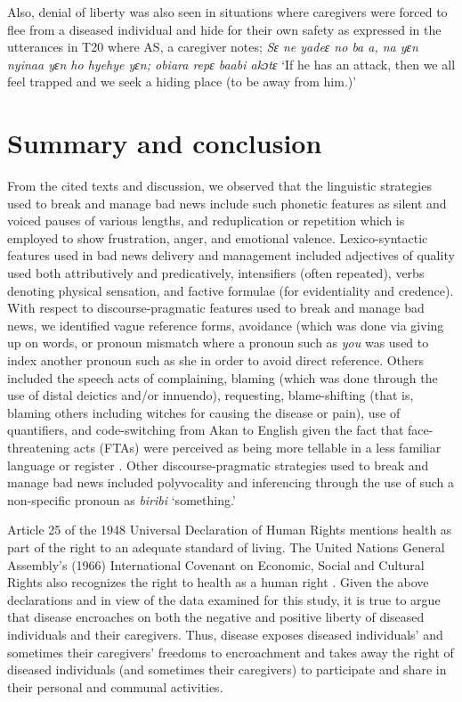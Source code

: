 \documentclass[output=paper,colorlinks,citecolor=brown]{langscibook}
\begin{document}
Also, denial of liberty was also seen in situations where caregivers were forced to flee from a diseased individual and hide for their own safety as expressed in the utterances in T20 where AS, a caregiver notes; \textit{Sɛ ne yadeɛ no ba a, na yɛn nyinaa yɛn ho hyehye yɛn; obiara repɛ baabi akɔtɛ} ‘If he has an attack, then we all feel trapped and we seek a hiding place (to be away from him.)’

\section{Summary and conclusion}\label{sec:obeng:5}

From the cited texts and discussion, we observed that the linguistic strategies used to break and manage bad news include such phonetic features as silent and voiced pauses of various lengths, and reduplication or repetition which is employed to show frustration, anger, and emotional valence. Lexico-syntactic features used in bad news delivery and management included adjectives of quality used both attributively and predicatively, intensifiers (often repeated), verbs denoting physical sensation, and factive formulae (for evidentiality and credence). With respect to discourse-pragmatic features used to break and manage bad news, we identified vague reference forms, avoidance (which was done via giving up on words, or pronoun mismatch where a pronoun such as \textit{you} was used to index another pronoun such as she in order to avoid direct reference. Others included the speech acts of complaining, blaming (which was done through the use of distal deictics and/or innuendo), requesting, blame-shifting (that is, blaming others including witches for causing the disease or pain), use of quantifiers, and code-switching from Akan to English given the fact that face-threatening acts (FTAs) were perceived as being more tellable in a less familiar language or register \citep{Movahedi1996, Obeng2008}. Other discourse-pragmatic strategies used to break and manage bad news included polyvocality and inferencing through the use of such a non-specific pronoun as \textit{biribi} ‘something.’

Article 25 of the 1948 Universal Declaration of Human Rights mentions health as part of the right to an adequate standard of living. The United Nations General Assembly’s (1966) International Covenant on Economic, Social and Cultural Rights also recognizes the right to health as a human right \citep{United-Nations-General-Assembly1948}. Given the above declarations and in view of the data examined for this study, it is true to argue that disease encroaches on both the negative and positive liberty of diseased individuals and their caregivers. Thus, disease exposes diseased individuals’ and sometimes their caregivers’ freedoms to encroachment and takes away the right of diseased individuals (and sometimes their caregivers) to participate and share in their personal and communal activities. 
\end{document}
